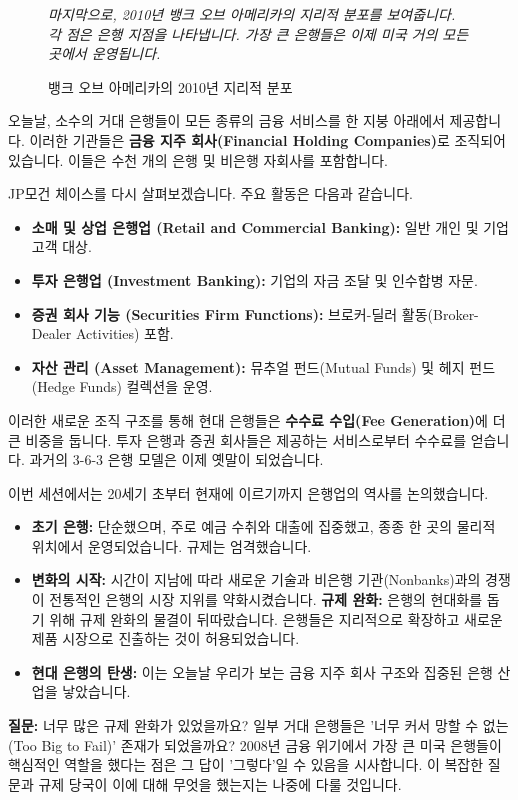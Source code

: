 \documentclass[11pt,a4paper]{book}
\theoremstyle{definition}
\begin{document}
\begin{figure}[h!]
    \centering
    \caption{뱅크 오브 아메리카의 2010년 지리적 분포}
    \label{fig:bank_of_america_2010}
    \textit{마지막으로, 2010년 뱅크 오브 아메리카의 지리적 분포를 보여줍니다. 각 점은 은행 지점을 나타냅니다. 가장 큰 은행들은 이제 미국 거의 모든 곳에서 운영됩니다.}
\end{figure}

오늘날, 소수의 거대 은행들이 모든 종류의 금융 서비스를 한 지붕 아래에서 제공합니다. 이러한 기관들은 \textbf{금융 지주 회사(Financial Holding Companies)}로 조직되어 있습니다. 이들은 수천 개의 은행 및 비은행 자회사를 포함합니다.

\begin{examplebox}[title={JP모건 체이스의 현대적 조직 구조}]
JP모건 체이스를 다시 살펴보겠습니다. 주요 활동은 다음과 같습니다.
\begin{itemize}
    \item \textbf{소매 및 상업 은행업 (Retail and Commercial Banking):} 일반 개인 및 기업 고객 대상.
    \item \textbf{투자 은행업 (Investment Banking):} 기업의 자금 조달 및 인수합병 자문.
    \item \textbf{증권 회사 기능 (Securities Firm Functions):} 브로커-딜러 활동(Broker-Dealer Activities) 포함.
    \item \textbf{자산 관리 (Asset Management):} 뮤추얼 펀드(Mutual Funds) 및 헤지 펀드(Hedge Funds) 컬렉션을 운영.
\end{itemize}
이러한 새로운 조직 구조를 통해 현대 은행들은 \textbf{수수료 수입(Fee Generation)}에 더 큰 비중을 둡니다. 투자 은행과 증권 회사들은 제공하는 서비스로부터 수수료를 얻습니다. 과거의 3-6-3 은행 모델은 이제 옛말이 되었습니다.
\end{examplebox}

\begin{summarybox}[title={Lesson 2-1 요약}]
이번 세션에서는 20세기 초부터 현재에 이르기까지 은행업의 역사를 논의했습니다.
\begin{itemize}
    \item \textbf{초기 은행:} 단순했으며, 주로 예금 수취와 대출에 집중했고, 종종 한 곳의 물리적 위치에서 운영되었습니다. 규제는 엄격했습니다.
    \item \textbf{변화의 시작:} 시간이 지남에 따라 새로운 기술과 비은행 기관(Nonbanks)과의 경쟁이 전통적인 은행의 시장 지위를 약화시켰습니다.
    \textbf{규제 완화:} 은행의 현대화를 돕기 위해 규제 완화의 물결이 뒤따랐습니다. 은행들은 지리적으로 확장하고 새로운 제품 시장으로 진출하는 것이 허용되었습니다.
    \item \textbf{현대 은행의 탄생:} 이는 오늘날 우리가 보는 금융 지주 회사 구조와 집중된 은행 산업을 낳았습니다.
\end{itemize}
\textbf{질문:} 너무 많은 규제 완화가 있었을까요? 일부 거대 은행들은 '너무 커서 망할 수 없는(Too Big to Fail)' 존재가 되었을까요? 2008년 금융 위기에서 가장 큰 미국 은행들이 핵심적인 역할을 했다는 점은 그 답이 '그렇다'일 수 있음을 시사합니다. 이 복잡한 질문과 규제 당국이 이에 대해 무엇을 했는지는 나중에 다룰 것입니다.
\end{summarybox}
\end{document}
